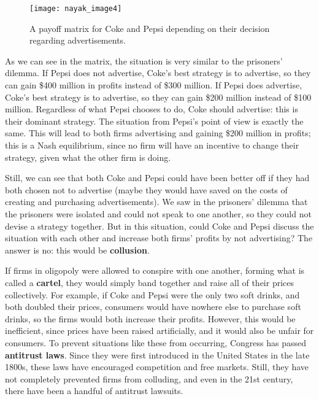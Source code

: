 \renewcommand{\thefigure}{4}
\begin{figure}[htp]
    \centering
    \begin{minipage}{9cm}
    \texttt{[image: nayak\_image4]}
    \caption{A payoff matrix for Coke and Pepsi depending on their decision regarding advertisements.}
    \label{fig:2}
    \end{minipage}
\end{figure}

As we can see in the matrix, the situation is very similar to the prisoners’ dilemma. If Pepsi does not advertise, Coke’s best strategy is to advertise, so they can gain \$400 million in profits instead of \$300 million. If Pepsi does advertise, Coke’s best strategy is to advertise, so they can gain \$200 million instead of \$100 million. Regardless of what Pepsi chooses to do, Coke should advertise: this is their dominant strategy. The situation from Pepsi’s point of view is exactly the same. This will lead to both firms advertising and gaining \$200 million in profits; this is a Nash equilibrium, since no firm will have an incentive to change their strategy, given what the other firm is doing.

Still, we can see that both Coke and Pepsi could have been better off if they had both chosen not to advertise (maybe they would have saved on the costs of creating and purchasing advertisements). We saw in the prisoners’ dilemma that the prisoners were isolated and could not speak to one another, so they could not devise a strategy together. But in this situation, could Coke and Pepsi discuss the situation with each other and increase both firms’ profits by not advertising? The answer is no: this would be \textbf{collusion}.

If firms in oligopoly were allowed to conspire with one another, forming what is called a \textbf{cartel}, they would simply band together and raise all of their prices collectively. For example, if Coke and Pepsi were the only two soft drinks, and both doubled their prices, consumers would have nowhere else to purchase soft drinks, so the firms would both increase their profits. However, this would be inefficient, since prices have been raised artificially, and it would also be unfair for consumers. To prevent situations like these from occurring, Congress has passed \textbf{antitrust laws}. Since they were first introduced in the United States in the late 1800s, these laws have encouraged competition and free markets. Still, they have not completely prevented firms from colluding, and even in the 21st century, there have been a handful of antitrust lawsuits.

